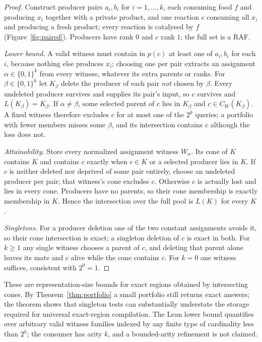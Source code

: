 \documentclass[11pt,a4paper]{article}
\theoremstyle{plain}
\theoremstyle{definition}
\theoremstyle{remark}
\begin{document}
\begin{proof}
Construct producer pairs $a_i,b_i$ for $i=1,\dots,k$, each consuming food $f$ and producing $x_i$ together with a private product, and one reaction $c$ consuming all $x_i$ and producing a fresh product; every reaction is catalysed by $f$ (Figure~\ref{fig:paired}). Producers have rank $0$ and $c$ rank $1$; the full set is a RAF.

\emph{Lower bound.} A valid witness must contain in $p(c)$ at least one of $a_i,b_i$ for each $i$, because nothing else produces $x_i$; choosing one per pair extracts an assignment $\alpha\in\{0,1\}^{k}$ from every witness, whatever its extra parents or ranks. For $\beta\in\{0,1\}^{k}$ let $K_\beta$ delete the producer of each pair \emph{not} chosen by $\beta$. Every undeleted producer survives and supplies its pair's input, so $c$ survives and $L(K_\beta)=K_\beta$. If $\alpha\ne\beta$, some selected parent of $c$ lies in $K_\beta$ and $c\in C_W(K_\beta)$. A fixed witness therefore excludes $c$ for at most one of the $2^{k}$ queries; a portfolio with fewer members misses some $\beta$, and its intersection contains $c$ although the loss does not.

\emph{Attainability.} Store every normalized assignment witness $W_\alpha$. Its cone of $K$ contains $K$ and contains $c$ exactly when $c\in K$ or a selected producer lies in $K$. If $c$ is neither deleted nor deprived of some pair entirely, choose an undeleted producer per pair; that witness's cone excludes $c$. Otherwise $c$ is actually lost and lies in every cone. Producers have no parents, so their cone membership is exactly membership in $K$. Hence the intersection over the full pool is $L(K)$ for every $K$.

\emph{Singletons.} For a producer deletion one of the two constant assignments avoids it, so their cone intersection is exact; a singleton deletion of $c$ is exact in both. For $k\ge1$ any single witness chooses a parent of $c$, and deleting that parent alone leaves its mate and $c$ alive while the cone contains $c$. For $k=0$ one witness suffices, consistent with $2^{0}=1$.
\end{proof}

These are representation-size bounds for exact regions obtained by intersecting cones. By Theorem~\ref{thm:portfolio} a small portfolio still returns exact answers; the theorem shows that singleton tests can substantially understate the storage required for universal exact-region compilation. The Lean lower bound quantifies over arbitrary valid witness families indexed by any finite type of cardinality less than $2^{k}$; the consumer has arity $k$, and a bounded-arity refinement is not claimed.
\end{document}
